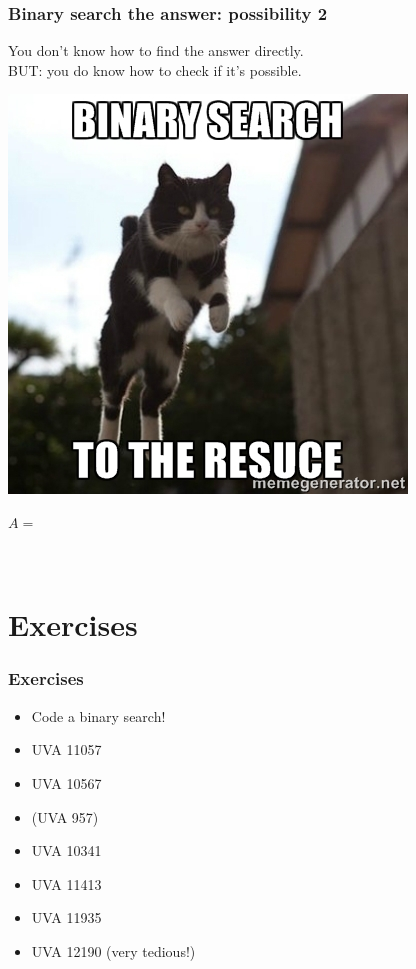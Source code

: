 \documentclass[12pt]{beamer}
\newcommand{\blank}{\vspace{.5cm}}
\begin{document}
\begin{frame}
	\frametitle{Binary search the answer: possibility 2}
	You don't know how to find the answer directly.\\
	BUT: you do know how to check if it's possible. \\
	\begin{center}
		\includegraphics[scale=0.3]{img/catrescue.jpg}
	\end{center}
	$A = $
		\\
\end{frame}

\section{Exercises}

\begin{frame}
	\frametitle{Exercises}
	\begin{itemize}
		\item Code a binary search!
		\item UVA 11057
		\item UVA 10567
		\item (UVA 957)
		\\\blank
		\item UVA 10341
		\item UVA 11413
		\item UVA 11935
		\\\blank
		\item UVA 12190 (very tedious!)
	\end{itemize}
	
\end{frame}
\end{document}
